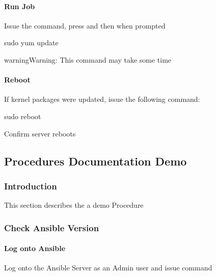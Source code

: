 \documentclass[letterpaper,10pt,english]{sphinxmanual}
\begin{document}
\paragraph{Run Job}
\label{\detokenize{install:run-job}}
\sphinxAtStartPar
Issue the command, press  and then \sphinxcode{\sphinxupquote{{[}ENTER{]}}} when prompted

\begin{sphinxVerbatim}[commandchars=\\\{\}]
sudo yum update
\end{sphinxVerbatim}

\begin{sphinxadmonition}{warning}{Warning:}
\sphinxAtStartPar
This command may take some time
\end{sphinxadmonition}


\paragraph{Reboot}
\label{\detokenize{install:reboot}}
\sphinxAtStartPar
If kernel packages were updated, issue the following command:

\begin{sphinxVerbatim}[commandchars=\\\{\}]
sudo reboot
\end{sphinxVerbatim}

\sphinxAtStartPar
{} Confirm server reboots


\subsection{Procedures Documentation \sphinxhyphen{} Demo}
\label{\detokenize{procedures:procedures-documentation-demo}}\label{\detokenize{procedures::doc}}

\subsubsection{Introduction}
\label{\detokenize{procedures:introduction}}
\sphinxAtStartPar
This section describes the a demo Procedure


\subsubsection{Check Ansible Version}
\label{\detokenize{procedures:check-ansible-version}}

\paragraph{Log onto Ansible}
\label{\detokenize{procedures:log-onto-ansible}}
\sphinxAtStartPar
Log onto the Ansible Server as an Admin user and issue command
\end{document}
